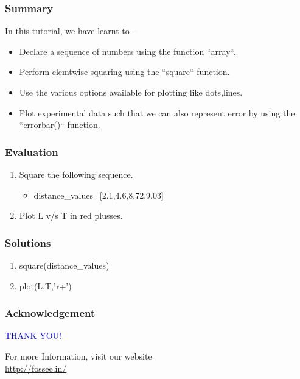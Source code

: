 \documentclass[presentation]{beamer}
\begin{document}
\begin{frame}
\frametitle{Summary}
\label{sec-8}

  In this tutorial, we have learnt to –

\begin{itemize}
\item Declare a sequence of numbers using the function ``array``.
\item Perform elemtwise squaring using the ``square`` function.
\item Use the various options available for plotting like dots,lines.
\item Plot experimental data such that we can also represent error by using the
    ``errorbar()`` function.
\end{itemize}
\end{frame}
\begin{frame}
\frametitle{Evaluation}
\label{sec-9}


\begin{enumerate}
\item Square the following sequence.
\begin{itemize}
\item distance\_values=[2.1,4.6,8.72,9.03]
\end{itemize}
\item Plot L v/s T in red plusses.
\end{enumerate}
\end{frame}
\begin{frame}
\frametitle{Solutions}
\label{sec-10}


\begin{enumerate}
\item square(distance\_values)
\item plot(L,T,'r+')
\end{enumerate}
\end{frame}
\begin{frame}
\frametitle{Acknowledgement}
\label{sec-11}

  \begin{block}{}
  \begin{center}
  \textcolor{blue}{\Large THANK YOU!} 
  \end{center}
  \end{block}
\begin{block}{}
  \begin{center}
    For more Information, visit our website\\
    \url{http://fossee.in/}
  \end{center}  
  \end{block}                                                                                                                                             
\end{frame}
\end{document}
